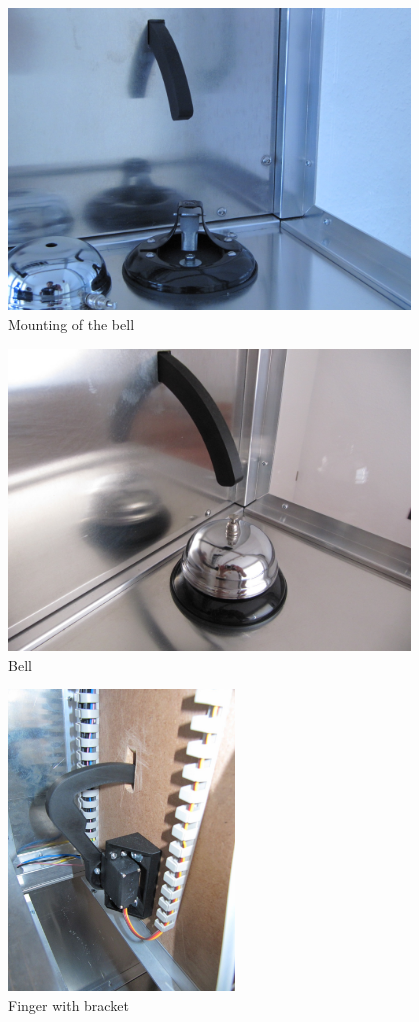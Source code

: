 \documentclass[a4paper]{scrartcl}
\begin{document}
\begin{figure}
  \centering
  \includegraphics[height=8cm]{pics/bell_mount.JPG}
  \caption{Mounting of the bell} \label{bell_mount}
\end{figure}

\begin{figure}
  \centering
  \includegraphics[height=8cm]{pics/bell.JPG}
  \caption{Bell} \label{bell}
\end{figure}

\begin{figure}
  \centering
  \includegraphics[height=8cm]{pics/finger.JPG}
  \caption{Finger with bracket} \label{finger}
\end{figure}
\end{document}
